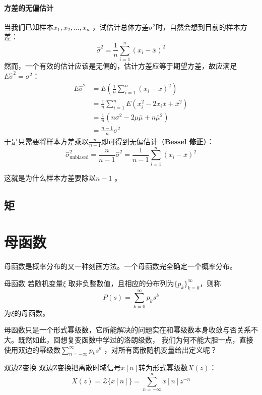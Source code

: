 \paragraph{方差的无偏估计}

当我们已知样本\(x_1, x_2, \ldots, x_n\) ，试估计总体方差\(\sigma^2\)时，自然会想到目前的样本方差：
\[
    \hat{\sigma}^{2}= \frac{1}{n} \sum_{i=1}^{n} (x_i - \bar{x})^2
\]
然而，一个有效的估计应该是无偏的，估计方差应等于期望方差，故应满足\(E \hat{\sigma}^{2} = \sigma^{2}\)：
\begin{align*}
    E \hat{\sigma}^{2} &= E\left( \frac{1}{n} \sum_{i=1}^{n} (x_i -
    \bar{x})^2 \right)\\
    &= \frac{1}{n} \sum_{i=1}^{n} E\left( x_i^2 - 2x_i\bar{x} +
    \bar{x}^2 \right)\\
    &= \frac{1}{n} \left( n\sigma^2 - 2\mu\bar{\mu} + n\bar{\mu}^2 \right)\\
    &= \frac{n-1}{n} \sigma^2
\end{align*}
于是只需要将样本方差乘以\(\frac{n}{n-1}\)即可得到无偏估计（\textbf{Bessel 修正}）：
\[
    \hat{\sigma}^{2}_{\text{unbiased}} = \frac{n}{n-1}
    \hat{\sigma}^{2} = \frac{1}{n-
    1} \sum_{i=1}^{n} (x_i - \bar{x})^2
\]

这就是为什么样本方差要除以\(n-1\) 。

\subsection{矩}
\section{母函数}
母函数是概率分布的又一种刻画方法。一个母函数完全确定一个概率分布。
\begin{definition}{母函数}
    若随机变量\(\xi\) 取非负整数值，且相应的分布列为\(\{p_k\}_{k=0}^{\infty}\)，则称
    \[
        P(s) = \sum_{k=0}^{\infty} p_k s^{k}
    \]
    为\(\xi\)的母函数。
\end{definition}

母函数只是一个形式幂级数，它所能解决的问题实在和幂级数本身收敛与否关系不大。既然如此，回想复变函数中学过的洛朗级数，
我们为何不能大胆一点，直接使用双边的幂级数\(\sum_{n=-\infty}^{\infty} p_{k}s^{k}
\) ，对所有离散随机变量给出定义呢？

\begin{definition}{双边Z变换}
    双边Z变换把离散时域信号\(x[n]\)转为形式幂级数\(X(z)\)：
    \[
        X(z) = \mathcal{Z}\{x[n]\} =\sum_{n=-\infty}^{\infty}
        x[n] z^{-n}
    \]
\end{definition}

